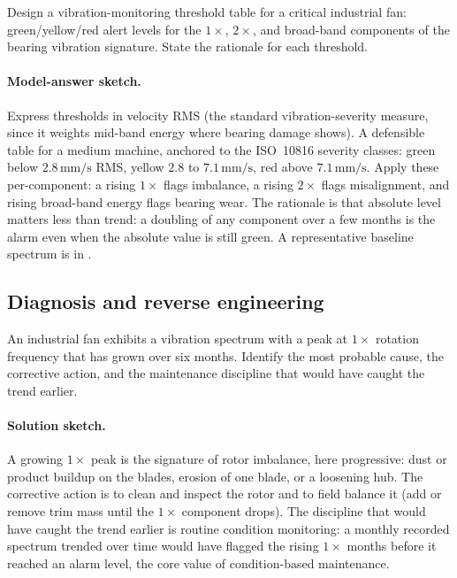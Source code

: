 \begin{exercise}
Design a vibration-monitoring threshold table for a critical
industrial fan: green/yellow/red alert levels for the $1\times$,
$2\times$, and broad-band components of the bearing vibration
signature. State the rationale for each threshold.

\paragraph{Model-answer sketch.} Express thresholds in velocity RMS
(the standard vibration-severity measure, since it weights mid-band
energy where bearing damage shows). A defensible table for a
medium machine, anchored to the ISO~10816 severity classes: green
below $2.8\,\si{\milli\meter\per\second}$ RMS, yellow $2.8$ to $7.1\,
\si{\milli\meter\per\second}$, red above $7.1\,\si{\milli\meter\per
\second}$. Apply these per-component: a rising $1\times$ flags
imbalance, a rising $2\times$ flags misalignment, and rising
broad-band energy flags bearing wear. The rationale is that absolute
level matters less than trend: a doubling of any component over a few
months is the alarm even when the absolute value is still green. A
representative baseline spectrum is in
.
\end{exercise}

\subsection*{Diagnosis and reverse engineering}

\begin{exercise}
An industrial fan exhibits a vibration spectrum with a peak at
$1\times$ rotation frequency that has grown over six months. Identify
the most probable cause, the corrective action, and the maintenance
discipline that would have caught the trend earlier.

\paragraph{Solution sketch.} A growing $1\times$ peak is the
signature of rotor imbalance, here progressive: dust or product
buildup on the blades, erosion of one blade, or a loosening hub. The
corrective action is to clean and inspect the rotor and to field
balance it (add or remove trim mass until the $1\times$ component
drops). The discipline that would have caught the trend earlier is
routine condition monitoring: a monthly recorded spectrum trended over
time would have flagged the rising $1\times$ months before it reached
an alarm level, the core value of condition-based maintenance.
\end{exercise}

